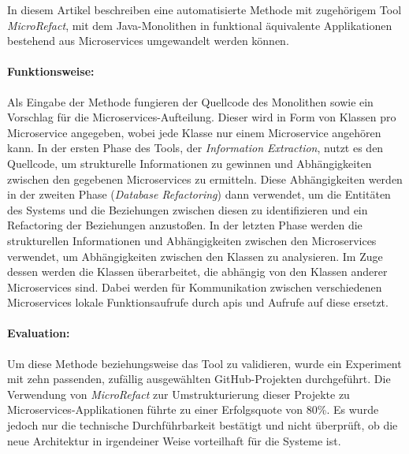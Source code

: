 In diesem Artikel beschreiben \citeauthor{arh-result-no-filter-4} eine automatisierte Methode mit zugehörigem Tool \emph{MicroRefact}, mit dem Java-Monolithen in funktional äquivalente Applikationen bestehend aus Microservices umgewandelt werden können.
\paragraph{Funktionsweise:} Als Eingabe der Methode fungieren der Quellcode des Monolithen sowie ein Vorschlag für die Microservices-Aufteilung. Dieser wird in Form von Klassen pro Microservice angegeben, wobei jede Klasse nur einem Microservice angehören kann.
In der ersten Phase des Tools, der \emph{Information Extraction}, nutzt es den Quellcode, um strukturelle Informationen zu gewinnen und Abhängigkeiten zwischen den gegebenen Microservices zu ermitteln.
Diese Abhängigkeiten werden in der zweiten Phase (\emph{Database Refactoring}) dann verwendet, um die Entitäten des Systems und die Beziehungen zwischen diesen zu identifizieren und ein Refactoring der Beziehungen anzustoßen.
In der letzten Phase werden die strukturellen Informationen und Abhängigkeiten zwischen den Microservices verwendet, um Abhängigkeiten zwischen den Klassen zu analysieren.
Im Zuge dessen werden die Klassen überarbeitet, die abhängig von den Klassen anderer Microservices sind.
Dabei werden für Kommunikation zwischen verschiedenen Microservices lokale Funktionsaufrufe durch \glspl{api} und Aufrufe auf diese ersetzt.

\paragraph{Evaluation:} Um diese Methode beziehungsweise das Tool zu validieren, wurde ein Experiment mit zehn passenden, zufällig ausgewählten GitHub-Projekten durchgeführt.
Die Verwendung von \emph{MicroRefact} zur Umstrukturierung dieser Projekte zu Microservices-Applikationen führte zu einer Erfolgsquote von 80\%.
Es wurde jedoch nur die technische Durchführbarkeit bestätigt und nicht überprüft, ob die neue Architektur in irgendeiner Weise vorteilhaft für die Systeme ist.

%

